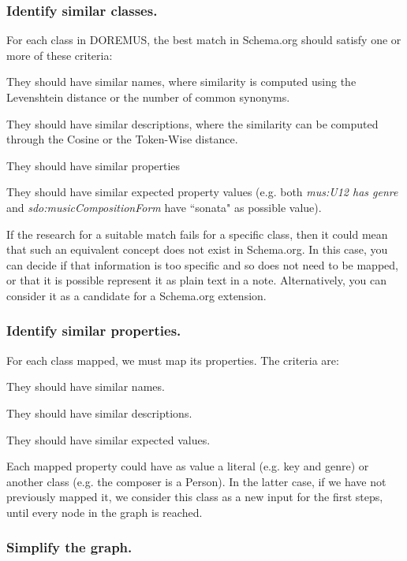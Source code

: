\documentclass{llncs}
\begin{document}
\subsubsection{Identify similar classes.}
\label{sec:classmap}
For each class in DOREMUS, the best match in Schema.org should satisfy one or more of these criteria:
\begin{enumerate*}
 \item{
They should have similar names, where similarity is computed using the Levenshtein distance or the number of common synonyms.
}
 \item{They should have similar descriptions, where the similarity can be computed through the Cosine or the Token-Wise distance.}
 \item{They should have similar properties}
 \item{They should have similar expected property values
(e.g. both \textit{mus:U12 has genre} and \textit{sdo:musicCompositionForm} have ``sonata" as possible value).
}
\end{enumerate*}

If the research for a suitable match fails for a specific class, then it could mean that such an equivalent concept does not exist in Schema.org. In this case, you can decide if that information is too specific and so does not need to be mapped, or that it is possible represent it as plain text in a note. Alternatively, you  can consider it as a candidate for a Schema.org extension.

\subsubsection{Identify similar properties.}
For each class mapped, we must map its properties. The criteria are:
\begin{enumerate*}
 \item{They should have similar names.}
 \item{They should have similar descriptions.}
 \item{They should have similar expected values.}
\end{enumerate*}

Each mapped property could have as value a literal (e.g. key and genre) or another class  (e.g. the composer is a Person). In the latter case, if we have not previously mapped it, we consider this class as a new input for the first steps, until every node in the graph is reached.

\subsubsection{Simplify the graph.}
\end{document}
